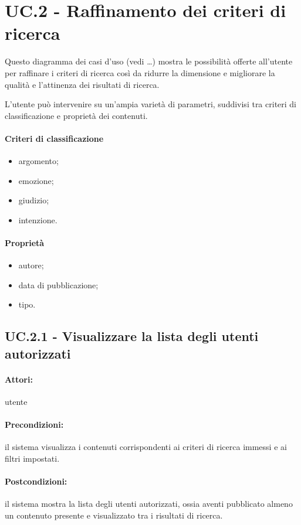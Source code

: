 \documentclass[10pt,a4paper,headinclude,footinclude,hidelinks]{scrreprt} %
\begin{document}
	\section[UC.2]{UC.2 - Raffinamento dei criteri di ricerca}
	\label{ch:stage:ar:uc:2}
	Questo diagramma dei casi d'uso (vedi \ldots) mostra le possibilità offerte all'utente per raffinare i criteri di ricerca così da ridurre la dimensione e migliorare la qualità e l'attinenza dei risultati di ricerca.

	L'utente può intervenire su un'ampia varietà di parametri, suddivisi tra criteri di classificazione e proprietà dei contenuti.

	\paragraph{Criteri di classificazione}
	\begin{itemize}
	\item argomento;
	\item emozione;
	\item giudizio;
	\item intenzione.
	\end{itemize}

	\paragraph{Propriet\`a}
	\begin{itemize}
	\item autore;
	\item data di pubblicazione;
	\item tipo.
	\end{itemize}

	\subsection[UC.2.1]{UC.2.1 - Visualizzare la lista degli utenti autorizzati}
	\label{ch:stage:ar:uc:2_1}
	\paragraph{Attori:} utente
	\paragraph{Precondizioni:} il sistema visualizza i contenuti corrispondenti ai criteri di ricerca immessi e ai filtri impostati.
	\paragraph{Postcondizioni:} il sistema mostra la lista degli utenti autorizzati, ossia aventi pubblicato almeno un contenuto presente e visualizzato tra i risultati di ricerca.
\end{document}

